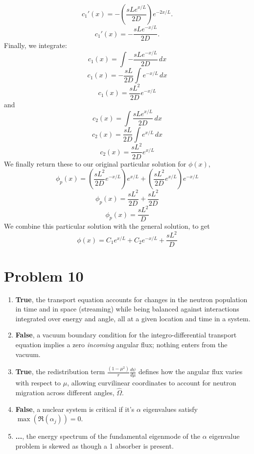 \documentclass{article}
\newcommand{\Oh}{\hat{\Omega}}
\begin{document}
$$ c_1'(x) = -\left(\frac{sLe^{x/L}}{2D}\right)e^{-2x/L} .$$
$$ c_1'(x) = -\frac{sLe^{-x/L}}{2D} .$$
Finally, we integrate:
$$ c_1(x) = \int -\frac{sLe^{-x/L}}{2D}\, dx $$
$$ c_1(x) = -\frac{sL}{2D}\int e^{-x/L}\, dx $$
$$ c_1(x) = \frac{sL^2}{2D}e^{-x/L}$$
and
$$ c_2(x) = \int \frac{sLe^{x/L}}{2D}\, dx $$
$$ c_2(x) = \frac{sL}{2D}\int e^{x/L}\, dx $$
$$ c_2(x) = \frac{sL^2}{2D}e^{x/L}$$
We finally return these to our original particular solution for $\phi(x)$,
$$ \phi_p(x) = \left(\frac{sL^2}{2D}e^{-x/L}\right)e^{x/L} + \left(\frac{sL^2}{2D}e^{x/L}\right)e^{-x/L} $$
$$ \phi_p(x) = \frac{sL^2}{2D} + \frac{sL^2}{2D} $$
$$ \phi_p(x) = \frac{sL^2}{D} $$
We combine this particular solution with the general solution, to get
$$\boxed{ \phi(x) = C_1e^{x/L} + C_2e^{-x/L} + \frac{sL^2}{D} }$$




\section*{Problem 10}

\begin{enumerate}
\item \textbf{True}, the transport equation accounts for changes in the neutron population in time and in space (streaming) while being balanced against interactions integrated over energy and angle, all at a given location and time in a system.
\item \textbf{False}, a vacuum boundary condition for the integro-differential transport equation implies a zero \textit{incoming} angular flux; nothing enters from the vacuum.
\item \textbf{True}, the redistribution term $\frac{(1-\mu^2)}{r}\frac{d\psi}{d\mu}$ defines how the angular flux varies with respect to $\mu$, allowing curvilinear coordinates to account for neutron migration across different angles, $\Oh$.
\item \textbf{False}, a nuclear system is critical if it’s $\alpha$ eigenvalues satisfy $\max(\Re(\alpha_j)) = 0$.
\item \textbf{...}, the energy spectrum of the fundamental eigenmode of the $\alpha$ eigenvalue problem is skewed as though a 1 absorber is present.
\end{enumerate}



\end{document}
